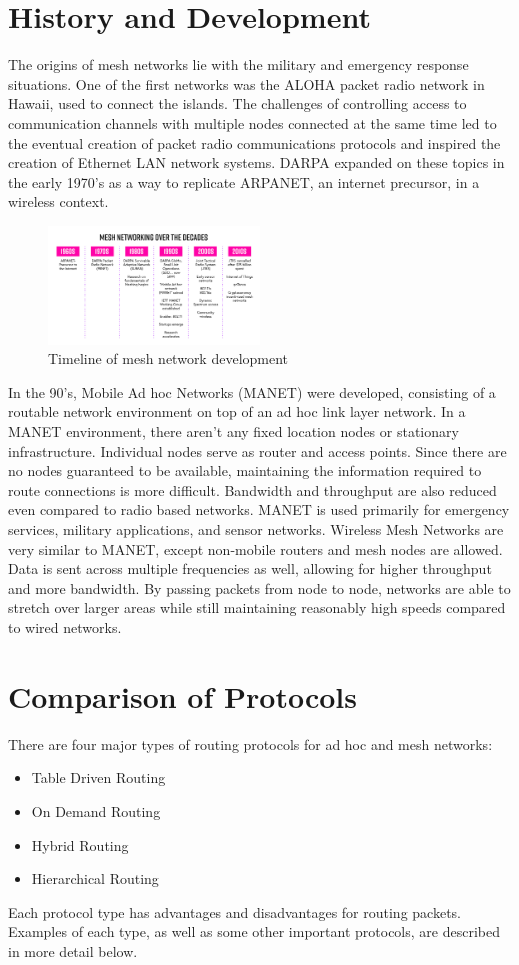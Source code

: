 \documentclass[conference]{IEEEtran}
\begin{document}
\section{History and Development}
The origins of mesh networks lie with the military and emergency response situations.  One of the first networks was the ALOHA packet radio network in Hawaii, used to connect the islands.
The challenges of controlling access to communication channels with multiple nodes connected at the same time led to the eventual creation of packet radio communications protocols and inspired the 
creation of Ethernet LAN network systems.  DARPA expanded on these topics in the early 1970's as a way to replicate ARPANET, an internet precursor, in a wireless context.
\begin{figure}[htbp]
    \includegraphics[width=0.5\textwidth]{timeline.jpg}
    \caption{Timeline of mesh network development \cite{ramanathan_2018}}
\end{figure}

In the 90's, Mobile Ad hoc Networks (MANET) were developed, consisting of a routable network environment on top of an ad hoc link layer network. In a MANET environment, there aren't any fixed location nodes
or stationary infrastructure\cite{geeksforgeeks_2020}.  Individual nodes serve as router and access points.  Since there are no nodes guaranteed to be available, maintaining the information required to route connections is more difficult.
Bandwidth and throughput are also reduced even compared to radio based networks.  MANET is used primarily for emergency services, military applications, and sensor networks.  Wireless Mesh Networks are very similar 
to MANET, except non-mobile routers and mesh nodes are allowed.  Data is sent across multiple frequencies as well, allowing for higher throughput and more bandwidth.  By passing packets from node to node, networks  
are able to stretch over larger areas while still maintaining reasonably high speeds compared to wired networks.
\section{Comparison of Protocols} 
There are four major types of routing protocols for ad hoc and mesh networks:
\begin{itemize}
    \item Table Driven Routing
    \item On Demand Routing
    \item Hybrid Routing
    \item Hierarchical Routing
\end{itemize}
Each protocol type has advantages and disadvantages for routing packets.  Examples of each type, as well as some other important protocols, are described in more detail below.
\end{document}
